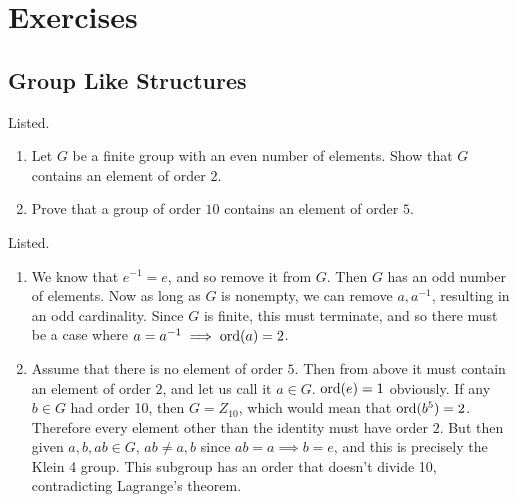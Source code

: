 \section{Exercises} 

\subsection{Group Like Structures}

  \begin{exercise}
    Listed. 
    \begin{enumerate}
      \item Let $G$ be a finite group with an even number of elements. Show that $G$ contains an element of order $2$. 
      \item Prove that a group of order $10$ contains an element of order $5$. 
    \end{enumerate}
  \end{exercise}
  \begin{solution}
    Listed. 
    \begin{enumerate}
      \item We know that $e^{-1} = e$, and so remove it from $G$. Then $G$ has an odd number of elements. Now as long as $G$ is nonempty, we can remove $a, a^{-1}$, resulting in an odd cardinality. Since $G$ is finite, this must terminate, and so there must be a case where $a = a^{-1} \implies \ord(a) = 2$. 
      \item Assume that there is no element of order $5$. Then from above it must contain an element of order $2$, and let us call it $a \in G$. $\ord(e) = 1$ obviously. If any $b \in G$ had order 10, then $G = Z_{10}$, which would mean that $\ord(b^5) = 2$. Therefore every element other than the identity must have order $2$. But then given $a, b, ab \in G$, $ab \neq a, b$ since $ab = a \implies b = e$, and this is precisely the Klein 4 group. This subgroup has an order that doesn't divide 10, contradicting Lagrange's theorem. 
    \end{enumerate}
  \end{solution}

